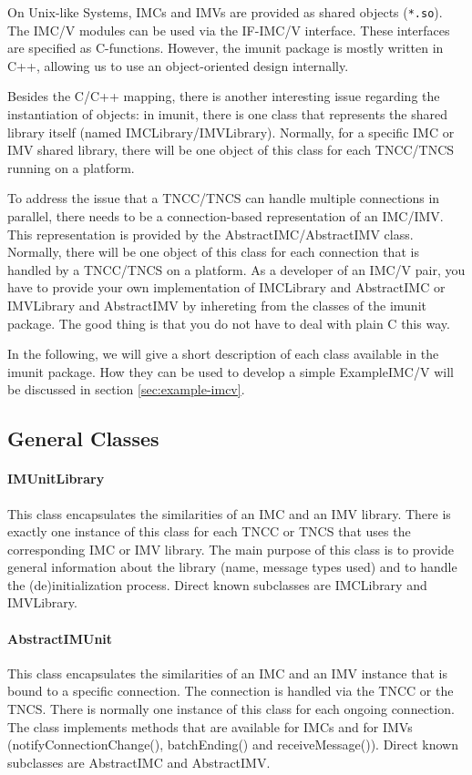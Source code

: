 \documentclass[a4paper,10pt]{scrartcl}
\begin{document}
On Unix-like Systems, IMCs and IMVs are provided as shared objects (\verb+*.so+). The IMC/V modules
can be used via the IF-IMC/V interface. These interfaces are specified as C-functions. However, the imunit
package is mostly written in C++, allowing us to use an object-oriented design internally.

Besides the C/C++ mapping, there is another interesting issue regarding the instantiation of objects:
in imunit, there is one class that represents the shared library itself (named IMCLibrary/IMVLibrary). Normally,
for a specific IMC or IMV shared library, there will be one object of this class for each TNCC/TNCS running on a platform.

To address the issue that
a TNCC/TNCS can handle multiple connections in parallel, there needs to be a connection-based representation of an IMC/IMV.
This representation is provided by the AbstractIMC/AbstractIMV class. Normally, there will be one object of this class
for each connection that is handled by a TNCC/TNCS on a platform. As a developer of an IMC/V pair, you have to provide your
own implementation of IMCLibrary and AbstractIMC or IMVLibrary and AbstractIMV by inhereting from the classes of the imunit package. The good
thing is that you do not have to deal with plain C this way.

In the following, we will give a short description of each class available in the imunit package. How they can be used to develop
a simple ExampleIMC/V will be discussed in section \ref{sec:example-imcv}.

\subsection{General Classes}
\paragraph{IMUnitLibrary} This class encapsulates the similarities of an IMC and an IMV library. There is exactly one instance of this class
for each TNCC or TNCS that uses the corresponding IMC or IMV library. The main purpose of this class is to provide general information about the
library (name, message types used) and to handle the (de)initialization process. Direct known subclasses are IMCLibrary and IMVLibrary.

\paragraph{AbstractIMUnit} This class encapsulates the similarities of an IMC and an IMV instance that is bound to a specific connection. The connection
is handled via the TNCC or the TNCS. There is normally one instance of this class for each ongoing connection. The class implements methods
that are available for IMCs and for IMVs (notifyConnectionChange(), batchEnding() and receiveMessage()). Direct known subclasses are AbstractIMC
and AbstractIMV.
\end{document}
